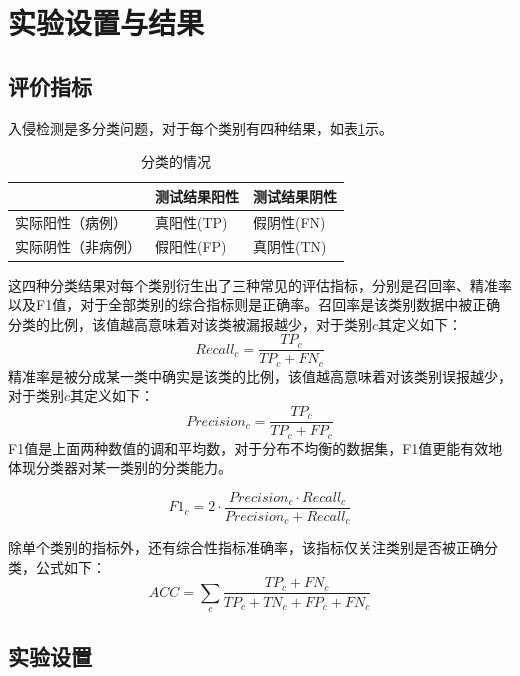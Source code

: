 \section{实验设置与结果}

\subsection{评价指标}

入侵检测是多分类问题，对于每个类别有四种结果，如表\ref{base_classify_situation}示。
\begin{table}[!ht]
    \centering
    \caption{分类的情况}
    \label{base_classify_situation}
    \begin{tabular}{lll}
    \toprule
        ~ & 测试结果阳性 & 测试结果阴性 \\
    \midrule
        实际阳性（病例） & 真阳性(TP) & 假阴性(FN) \\
        实际阴性（非病例） & 假阳性(FP) & 真阴性(TN) \\
    \bottomrule
    \end{tabular}
\end{table}

这四种分类结果对每个类别衍生出了三种常见的评估指标，分别是召回率、精准率以及F1值，对于全部类别的综合指标则是正确率。召回率是该类别数据中被正确分类的比例，该值越高意味着对该类被漏报越少，对于类别$c$其定义如下：
\begin{equation}
{Recall}_c = \frac{TP_c}{TP_c + FN_c}
\end{equation}
精准率是被分成某一类中确实是该类的比例，该值越高意味着对该类别误报越少，对于类别$c$其定义如下：
\begin{equation}
{Precision}_c = \frac{TP_c}{TP_c + FP_c}
\end{equation}
F1值是上面两种数值的调和平均数，对于分布不均衡的数据集，F1值更能有效地体现分类器对某一类别的分类能力。

\begin{equation}
F1_c = 2 \cdot \frac{{Precision}_c \cdot {Recall}_c}{{Precision}_c + {Recall}_c}
\end{equation}


除单个类别的指标外，还有综合性指标准确率，该指标仅关注类别是否被正确分类，公式如下：
\begin{equation}
{ACC} = \sum_c\frac{TP_c+FN_c}{TP_c + TN_c + FP_c + FN_c}
\end{equation}

\subsection{实验设置}

